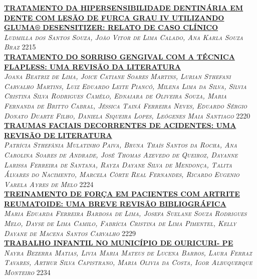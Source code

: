 \noindent \textsc{\hyperlink{trabalhos/250310.pdf.1}{\textbf{TRATAMENTO DA HIPERSENSIBILIDADE DENTINÁRIA EM DENTE COM LESÃO DE FURCA GRAU IV UTILIZANDO GLUMA® DESENSITIZER: RELATO DE CASO CLÍNICO}}}\\ 
\noindent \textsc{\textit{Ludmilla dos Santos Souza, João Vitor de Lima Calado, Ana Karla Souza Braz}} \hfill 2215\\ 

\noindent \textsc{\hyperlink{trabalhos/250114.pdf.1}{\textbf{TRATAMENTO DO SORRISO GENGIVAL COM A TÉCNICA FLAPLESS: UMA REVISÃO DA LITERATURA}}}\\ 
\noindent \textsc{\textit{Joana Beatriz de Lima, Joice Catiane Soares Martins, Lurian Sthefani Carvalho Martins, Luiz Eduardo Leite Piancó, Milena Lima da Silva, Sílvia Cristina Silva Rodrigues Camêlo, Ednaiara de Oliveira Souza, Maria Fernanda de Britto Cabral, Jéssica Tainá Ferreira Neves, Eduardo Sérgio Donato Duarte Filho, Daniela Siqueira Lopes, Leógenes Maia Santiago}} \hfill 2220\\ 

\noindent \textsc{\hyperlink{trabalhos/249897.pdf.1}{\textbf{TRAUMAS FACIAIS DECORRENTES DE ACIDENTES: UMA REVISÃO DE LITERATURA}}}\\ 
\noindent \textsc{\textit{Patrícia Sthefânia Mulatinho Paiva, Bruna Thaís Santos da Rocha, Ana Carolina Soares de Andrade, José Thomas Azevedo de Queiroz, Dayanne Larissa Ferreira de Santana, Rayza Dayane Silva de Mendonça, Talita Álvares do Nacimento, Marcela Côrte Real Fernandes, Ricardo Eugenio Varela Ayres de Melo}} \hfill 2224\\ 

\noindent \textsc{\hyperlink{trabalhos/250397.pdf.1}{\textbf{TREINAMENTO DE FORÇA EM PACIENTES COM ARTRITE REUMATOIDE: UMA BREVE REVISÃO BIBLIOGRÁFICA}}}\\ 
\noindent \textsc{\textit{Maria Eduarda Ferreira Barbosa de Lima, Josefa Suelane Souza Rodrigues Melo, Dayse de Lima Camilo, Fabrícia Cristina de Lima Pimentel, Kelly Dayane de Macena Santos Carvalho}} \hfill 2229\\ 

\noindent \textsc{\hyperlink{trabalhos/249879.pdf.1}{\textbf{TRABALHO INFANTIL NO MUNICÍPIO DE OURICURI- PE }}}\\ 
\noindent \textsc{\textit{Nayra Bezerra Matias, Livia Maria Mateus de Lucena Barros, Laura Ferraz Tavares, Arthur Silva Capistrano, Maria Olivia da Costa, Igor Albuquerque Monteiro}} \hfill 2234\\ 

